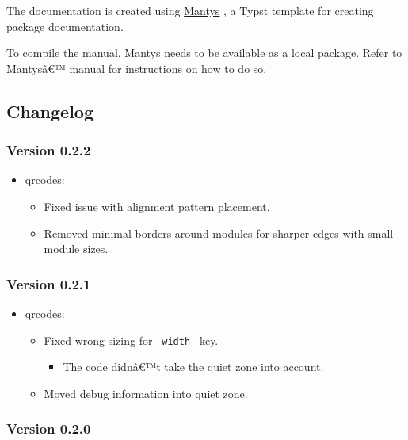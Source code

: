 The documentation is created using
\href{https://github.com/jneug/typst-mantys}{Mantys} , a Typst template
for creating package documentation.

To compile the manual, Mantys needs to be available as a local package.
Refer to Mantysâ€™ manual for instructions on how to do so.

\subsection{Changelog}\label{changelog}

\subsubsection{Version 0.2.2}\label{version-0.2.2}

\begin{itemize}
\tightlist
\item
  qrcodes:

  \begin{itemize}
  \tightlist
  \item
    Fixed issue with alignment pattern placement.
  \item
    Removed minimal borders around modules for sharper edges with small
    module sizes.
  \end{itemize}
\end{itemize}

\subsubsection{Version 0.2.1}\label{version-0.2.1}

\begin{itemize}
\tightlist
\item
  qrcodes:

  \begin{itemize}
  \tightlist
  \item
    Fixed wrong sizing for \texttt{\ width\ } key.

    \begin{itemize}
    \tightlist
    \item
      The code didnâ€™t take the quiet zone into account.
    \end{itemize}
  \item
    Moved debug information into quiet zone.
  \end{itemize}
\end{itemize}

\subsubsection{Version 0.2.0}\label{version-0.2.0}

